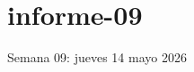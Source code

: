 \documentclass[./informes.tex]{subfiles}
\begin{document}
\chapter{informe-09}

Semana 09: jueves 14 mayo 2026






\printbibliography[
  heading=subbibliography
]
\end{document}
